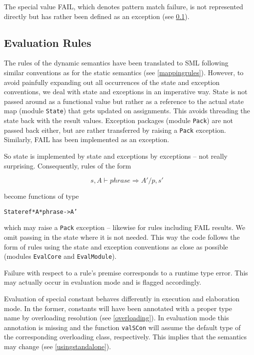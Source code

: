 \documentclass[twoside,titlepage]{article}
\begin{document}
The special value FAIL, which denotes pattern match failure, is not represented directly but has rather been defined as an exception (see \ref{evaluationrules}).


\subsection{Evaluation Rules}
\label{evaluationrules}

The rules of the dynamic semantics have been translated to SML following similar conventions as for the static semantics (see \ref{mappingrules}). However, to avoid painfully expanding out all occurrences of the state and exception conventions, we deal with state and exceptions in an imperative way. State is not passed around as a functional value but rather as a reference to the actual state map (module {\tt State}) that gets updated on assignments. This avoids threading the state back with the result values. Exception packages (module {\tt Pack}) are not passed back either, but are rather transferred by raising a {\tt Pack} exception. Similarly, FAIL has been implemented as an exception.

So state is implemented by state and exceptions by exceptions -- not really surprising. Consequently, rules of the form

\begin{displaymath}
s,A \vdash \mathit{phrase} \Rightarrow A'/p,s'
\end{displaymath}

become functions of type

\begin{alltt}
\hfill State ref * A * phrase -> A' \hfill
\end{alltt}

which may raise a {\tt Pack} exception -- likewise for rules including FAIL results. We omit passing in the state where it is not needed. This way the code follows the form of rules using the state and exception conventions as close as possible (modules {\tt EvalCore} and {\tt EvalModule}).

Failure with respect to a rule's premise corresponds to a runtime type error. This may actually occur in evaluation mode and is flagged accordingly.%

Evaluation of special constant behaves differently in execution and elaboration mode. In the former, constants will have been annotated with a proper type name by overloading resolution (see \ref{overloading}). In evaluation mode this annotation is missing and the function {\tt valSCon} will assume the default type of the corresponding overloading class, respectively. This implies that the semantics may change (see \ref{usingstandalone}).
\end{document}
